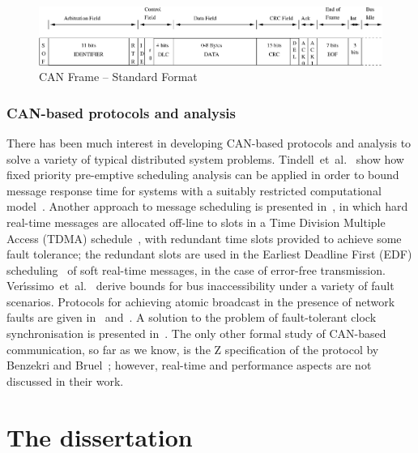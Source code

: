 \begin{figure}
\includegraphics[width=\linewidth]{INTRO/canframe.eps}
\caption{CAN Frame -- Standard Format\label{fig:canframe}}
\end{figure}

\subsubsection{CAN-based protocols and analysis}
There has been much interest in developing CAN-based protocols and
analysis to solve a variety of typical distributed system problems.
Tindell~et~al.~\cite{thw:94} show how fixed priority pre-emptive
scheduling analysis can be applied in order to bound message response time for
systems with a suitably restricted computational model~\cite{tbw:95}.
Another approach to message scheduling is presented in~\cite{lkj:99},
in which hard real-time messages are allocated off-line to slots in a
Time Division Multiple Access (TDMA) schedule~\cite{ks:97}, with
redundant time slots provided to achieve some fault tolerance; the
redundant slots are used in the Earliest Deadline First (EDF)
scheduling~\cite{ks:97} of soft real-time messages, in the case of
error-free transmission. Ver{\'\i}ssimo~et~al.~\cite{vrm:97} derive
bounds for bus inaccessibility under a variety of fault
scenarios. Protocols for achieving atomic broadcast in the presence of
network faults are given in~\cite{rva:98} and~\cite{lk:99}. A solution
to the problem of fault-tolerant clock synchronisation is presented
in~\cite{rgr:98}.  The only other formal study of CAN-based
communication, so far as we know, is the Z specification of the
protocol by Benzekri and Bruel~\cite{bb:97}; however, real-time and
performance aspects are not discussed in their work.

\section{The dissertation}
